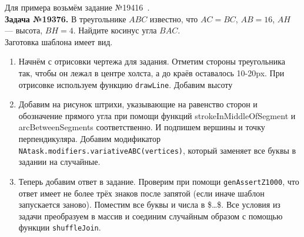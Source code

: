 Для примера возьмём задание №19416~\cite{egemath}.
\\
\textbf{Задача №19376.}
В треугольнике $ABC$ известно, что ${AC=BC}$, $AB=16$, $AH$ — высота, $BH=4$. Найдите косинус угла $BAC$.\\ 

Заготовка шаблона имеет вид.



\begin{enumerate}
    \item Начнём с отрисовки чертежа для задания. Отметим стороны треугольника так, чтобы он лежал в центре холста, а до краёв оставалось 10-20px. При отрисовке используем функцию \texttt{drawLine}. Добавим высоту 
     
    \item Добавим на рисунок штрихи, указывающие на равенство сторон и обозначение прямого угла при помощи функций strokeInMiddleOfSegment и arcBetweenSegments соответственно. И подпишем вершины и точку перпендикуляра. Добавим модификатор \texttt{NAtask.modifiers.variativeABC(vertices)}, который заменяет все буквы в задании на случайные.

     
    \item Теперь добавим ответ в задание. Проверим при помощи \texttt{genAssertZ1000}, что ответ имеет не более трёх знаков после запятой (если иначе шаблон запускается заново). Поместим все буквы и числа в \$\dots\$. Все условия из задачи преобразуем в массив и соединим случайным образом с помощью функции \texttt{shuffleJoin}.
     
\end{enumerate}

